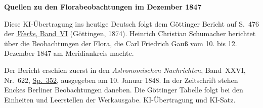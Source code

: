 \clearpage\thispagestyle{empty}
\begin{center}\textbf{Quellen zu den Florabeobachtungen im Dezember 1847}\end{center}
\noindent Diese KI-Übertragung ins heutige Deutsch folgt dem Göttinger Bericht auf S.~476 der \href{https://gdz.sub.uni-goettingen.de/id/PPN236007467}{\textit{Werke}, Band~VI} (Göttingen, 1874). Heinrich Christian Schumacher berichtet über die Beobachtungen der Flora, die Carl Friedrich Gauß vom 10. bis 12. Dezember 1847 am Meridiankreis machte.
\par\smallskip\noindent Der Bericht erschien zuerst in den \textit{Astronomischen Nachrichten}, Band~XXVI, Nr.~622, \href{https://api.digitale-sammlungen.de/iiif/image/v2/bsb10049451_00186/full/1800,/0/default.jpg}{Sp.~352}, ausgegeben am 10. Januar 1848. In der Zeitschrift stehen Enckes Berliner Beobachtungen daneben. Die Göttinger Tabelle folgt bei den Einheiten und Leerstellen der Werkausgabe. KI-Übertragung und KI-Satz.
\clearpage

